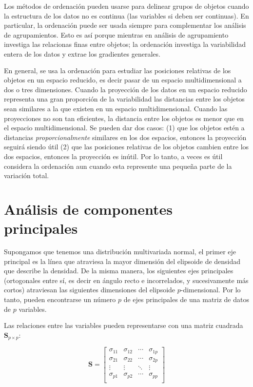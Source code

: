 \documentclass[]{book}
\theoremstyle{definition}
\theoremstyle{definition}
\theoremstyle{definition}
\theoremstyle{remark}
\begin{document}
Los métodos de ordenación pueden usarse para delinear grupos de objetos
cuando la estructura de los datos no es continua (las variables si deben
ser continuas). En particular, la ordenación puede ser usada siempre
para complementar los análisis de agrupamientos. Esto es así porque
mientras en análisis de agrupamiento investiga las relacionas finas
entre objetos; la ordenación investiga la variabilidad entera de los
datos y extrae los gradientes generales.

En general, se usa la ordenación para estudiar las posiciones relativas
de los objetos en un espacio reducido, es decir pasar de un espacio
multidimensional a dos o tres dimensiones. Cuando la proyección de los
datos en un espacio reducido representa una gran proporción de la
variabilidad las distancias entre los objetos sean similares a la que
existen en un espacio multidimensional. Cuando las proyecciones no son
tan eficientes, la distancia entre los objetos es menor que en el
espacio multidimensional. Se pueden dar dos casos: (1) que los objetos
estén a distancias \emph{proporcionalmente} similares en los dos
espacios, entonces la proyección seguirá siendo útil (2) que las
posiciones relativas de los objetos cambien entre los dos espacios,
entonces la proyección es inútil. Por lo tanto, a veces es útil
considera la ordenación aun cuando esta represente una pequeña parte de
la variación total.

\hypertarget{analisis-de-componentes-principales}{%
\section{Análisis de componentes
principales}\label{analisis-de-componentes-principales}}

Supongamos que tenemos una distribución multivariada normal, el primer
eje principal es la línea que atraviesa la mayor dimensión del elipsoide
de densidad que describe la densidad. De la misma manera, los siguientes
ejes principales (ortogonales entre sí, es decir en ángulo recto e
incorrelados, y sucesivamente más cortos) atraviesan las siguientes
dimensiones del elipsoide \(p\)-dimensional. Por lo tanto, pueden
encontrarse un número \(p\) de ejes principales de una matriz de datos
de \(p\) variables.

Las relaciones entre las variables pueden representarse con una matriz
cuadrada \(\mathbf{S}_{p \times p}\):

\[
\mathbf{S} = \begin{bmatrix}
\sigma_{11} & \sigma_{12} & \cdots & \sigma_{1p} \\
\sigma_{21} & \sigma_{22} & \cdots & \sigma_{2p} \\
 \vdots & \vdots & \ddots & \vdots \\
\sigma_{p1} & \sigma_{p2} & \cdots & \sigma_{pp} \\
\end{bmatrix}
\]
\end{document}

